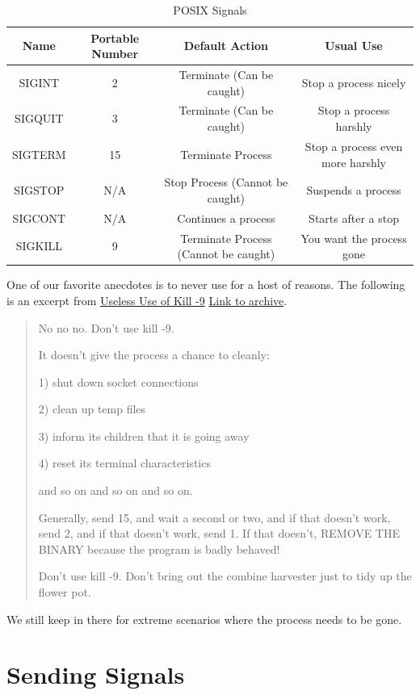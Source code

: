 \begin{table}[h]
  \centering
\caption{POSIX Signals}
\begin{tabular}{|c|c|c|c|}
Name & Portable Number & Default Action & Usual Use \\ \hline
SIGINT & 2 & Terminate (Can be caught) & Stop a process nicely \\
SIGQUIT & 3 & Terminate (Can be caught) & Stop a process harshly \\
SIGTERM & 15 & Terminate Process & Stop a process even more harshly \\
SIGSTOP & N/A & Stop Process (Cannot be caught) & Suspends a process \\
SIGCONT & N/A & Continues a process & Starts after a stop \\
SIGKILL & 9 & Terminate Process (Cannot be caught) & You want the process gone
\end{tabular}
\end{table}

One of our favorite anecdotes is to never use  for a host of reasons.
The following is an excerpt from \underline{Useless Use of Kill -9} \href{http://porkmail.org/era/unix/award.html}{Link to archive}.

\begin{quote}
No no no.  Don't use kill -9.

It doesn't give the process a chance to cleanly:

1) shut down socket connections

2) clean up temp files

3) inform its children that it is going away

4) reset its terminal characteristics

and so on and so on and so on.

Generally, send 15, and wait a second or two, and if that doesn't
work, send 2, and if that doesn't work, send 1.  If that doesn't,
REMOVE THE BINARY because the program is badly behaved!

Don't use kill -9.  Don't bring out the combine harvester just to tidy
up the flower pot.
\end{quote}

We still keep  in there for extreme scenarios where the process needs to be gone.

\section{Sending Signals}

